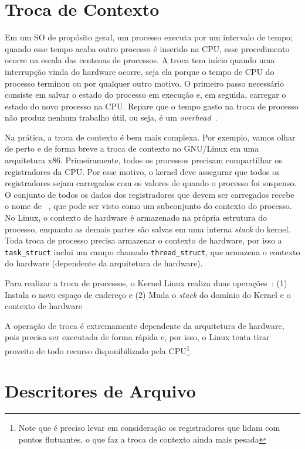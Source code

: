 \section{Troca de Contexto}

Em um SO de propósito geral, um processo executa por um intervalo de tempo;
quando esse tempo acaba outro processo é inserido na CPU, esse procedimento
ocorre na escala das centenas de processos. A troca tem início quando uma
interrupção vinda do hardware ocorre, seja ela porque o tempo de CPU do
processo terminou ou por qualquer outro motivo. O primeiro passo necessário
consiste em salvar o estado do processo em execução e, em seguida, carregar o
estado do novo processo na CPU. Repare que o tempo gasto na troca de processo
não produz nenhum trabalho útil, ou seja, é um
\textit{overhead}~\citep{silberschatz}.

Na prática, a troca de contexto é bem mais complexa. Por exemplo, vamos olhar
de perto e de forma breve a troca de contexto no GNU/Linux em uma arquitetura
x86.  Primeiramente, todos os processos precisam compartilhar os registradores
da CPU. Por esse motivo, o kernel deve assegurar que todos os registradores
sejam carregados com os valores de quando o processo foi suspenso. O conjunto
de todos os dados dos registradores que devem ser carregados recebe o nome de
~\citep{entendendo_kernel}, que pode ser
visto como um subconjunto do contexto do processo. No Linux, o contexto de
hardware é armazenado na própria estrutura do processo, enquanto as demais
partes são salvas em uma interna \emph{stack} do kernel. Toda troca de processo
precisa armazenar o contexto de hardware, por isso a \texttt{task\_struct}
inclui um campo chamado \texttt{thread\_struct}, que armazena o contexto do
hardware (dependente da arquitetura de hardware).

Para realizar a troca de processos, o Kernel Linux realiza duas
operações~\citep{entendendo_kernel}: (1) Instala o novo espaço de endereço e
(2) Muda o \emph{stack} do domínio do Kernel e o contexto de hardware

A operação de troca é extremamente dependente da arquitetura de hardware, pois
precisa ser executada de forma rápida e, por isso, o Linux tenta tirar proveito
de todo recurso disponibilizado pela CPU\footnote{Note que é preciso levar em
consideração os registradores que lidam com pontos flutuantes, o que faz a troca
de contexto ainda mais pesada}.

\section{Descritores de Arquivo}

